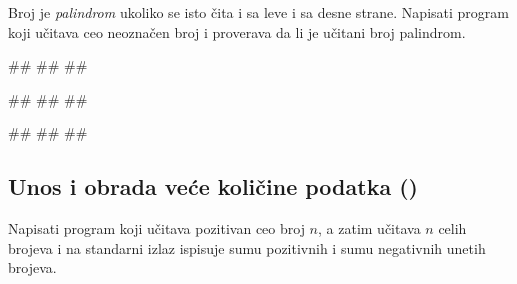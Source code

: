 \begin{Exercise}[difficulty=1, label=p1.3_15] 
Broj je \textit{palindrom} ukoliko se isto čita i sa leve i sa desne
strane. Napisati program koji učitava ceo neoznačen broj i proverava
da li je učitani broj palindrom. 

\begin{miditest}
\begin{upotreba}{1}
#\naslovInt#
##
##
\end{upotreba}
\end{miditest}
\begin{miditest}
\begin{upotreba}{2}
#\naslovInt#
##
##
\end{upotreba}
\end{miditest}

\begin{miditest}
\begin{upotreba}{3}
#\naslovInt#
##
##
\end{upotreba}
\end{miditest}
\end{Exercise}
\begin{Answer}[ref=p1.3_15]
\end{Answer}


\subsection{Unos i obrada veće količine podatka () }

\begin{Exercise}[label=v1.3_04] 
Napisati program koji učitava pozitivan ceo broj $n$, a zatim učitava
$n$ celih brojeva i na standarni izlaz ispisuje sumu pozitivnih i sumu
negativnih unetih brojeva.  
\end{Exercise}
\begin{Answer}[ref=v1.3_04]
\end{Answer}

